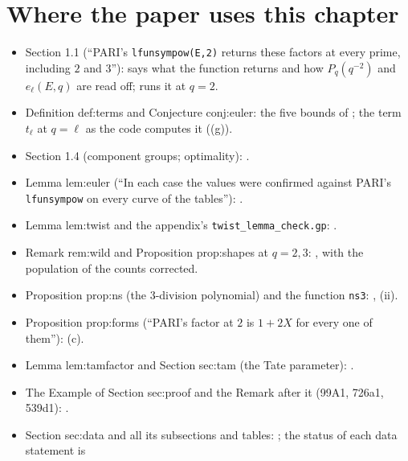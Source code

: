 \section*{Where the paper uses this chapter}
\begin{sloppypar}

\begin{itemize}
\item Section 1.1 (``PARI's \texttt{lfunsympow(E,2)} returns these factors at every prime, including $2$ and $3$''):  says what the
function returns and how $P_q(q^{-2})$ and $e_\ell(E,q)$ are read off;  runs it at $q=2$.
\item Definition def:terms and Conjecture conj:euler: the five bounds of ; the term $t_\ell$ at $q=\ell$ as the code computes it
((g)).
\item Section 1.4 (component groups; optimality): .
\item Lemma lem:euler (``In each case the values were confirmed against PARI's \texttt{lfunsympow} on every curve of the tables''): .
\item Lemma lem:twist and the appendix's \texttt{twist\_lemma\_check.gp}: .
\item Remark rem:wild and Proposition prop:shapes at $q=2,3$: , with the population of the counts corrected.
\item Proposition prop:ns (the $3$-division polynomial) and the function \texttt{ns3}: , (ii).
\item Proposition prop:forms (``PARI's factor at $2$ is $1+2X$ for every one of them''): (c).
\item Lemma lem:tamfactor and Section sec:tam (the Tate parameter): .
\item The Example of Section sec:proof and the Remark after it (99A1, 726a1, 539d1): .
\item Section sec:data and all its subsections and tables: ; the status of each data statement is

\end{itemize}
\end{sloppypar}

